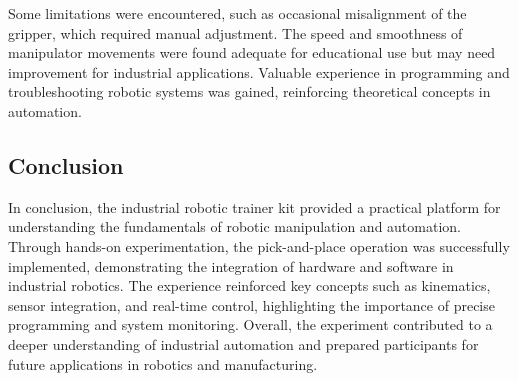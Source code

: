 \documentclass[12pt]{article}
\begin{document}
Some limitations were encountered, such as occasional misalignment of the gripper, which required manual adjustment. The speed and smoothness of manipulator movements were found adequate for educational use but may need improvement for industrial applications. Valuable experience in programming and troubleshooting robotic systems was gained, reinforcing theoretical concepts in automation.

\subsection*{Conclusion}
In conclusion, the industrial robotic trainer kit provided a practical platform for understanding the fundamentals of robotic manipulation and automation. Through hands-on experimentation, the pick-and-place operation was successfully implemented, demonstrating the integration of hardware and software in industrial robotics. The experience reinforced key concepts such as kinematics, sensor integration, and real-time control, highlighting the importance of precise programming and system monitoring. Overall, the experiment contributed to a deeper understanding of industrial automation and prepared participants for future applications in robotics and manufacturing.



\renewcommand{\bibname}{References}

\end{document}
